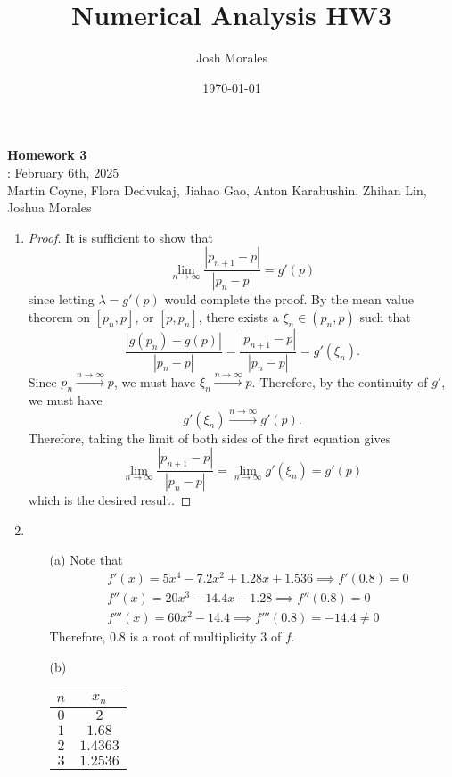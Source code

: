 \documentclass[12pt]{article}
\title{Numerical Analysis HW3}
\author{Josh Morales}
\date{\today}
\begin{document}
\pagestyle{fancy}
\begin{center}
\textbf{\Large Homework 3} \\
: February 6th, 2025\\
Martin Coyne, Flora Dedvukaj, Jiahao Gao, Anton Karabushin, Zhihan Lin, Joshua Morales
\end{center}
\begin{enumerate}[leftmargin=2em]
    \item
	\begin{proof}
	  It is sufficient to show that 
	  \[\lim_{n\to \infty}\frac{|p_{n+1}-p|}{|p_{n}-p|}=g'(p)\]
	  since letting $\lambda = g'(p)$ would complete the proof. By the mean value theorem on $[p_n,p]$, or $[p,p_n]$, there exists a $\xi_n\in (p_n,p)$ such that
	   \[
		 \frac{|g(p_n)-g(p)|}{|p_n-p|}=\frac{|p_{n+1}-p|}{|p_{n}-p|}= g'(\xi_n)
	  .\] 
	  Since $p_n \xrightarrow{n\to \infty} p$, we must have	$\xi_{n}\xrightarrow{n\to \infty} p$. Therefore, by the continuity of $g'$, we must have 
	  \[g'(\xi_n)\xrightarrow{n\to \infty} g'(p).\] 
	  Therefore, taking the limit of both sides of the first equation gives
	  \[\lim_{n\to \infty } \frac{|p_{n+1}-p|}{|p_{n}-p|}=\lim_{n\to \infty} g'(\xi_n)=g'(p)\]
	  which is the desired result.
	\end{proof}
    \item 
    \begin{enumerate}
        \item[(a)] Note that
		  \begin{align*}
			&f'(x)=5x^4-7.2x^2+1.28x+1.536 \implies 	f'(0.8)=0\\
			&f''(x) = 20x^3-14.4 x+1.28 \implies f''(0.8) = 0\\
			&f'''(x)=60x^2-14.4 \implies f'''(0.8)=-14.4\neq 0
		  \end{align*}
        Therefore, $0.8$ is a root of multiplicity $3$ of $f$.
        \item[(b)]
		  	\begin{center}
		    \begin{tabular}{|c|c|}
		  	\hline
			$n$ & $x_n$\\
			\hline
			$0$ & $2$\\
			\hline
			$1$ & $1.68$\\
			\hline
			$2$ & $1.4363$\\
			\hline
			$3$ & $1.2536$\\

\end{tabular}
\end{center}
\end{enumerate}
\end{enumerate}
\end{document}
